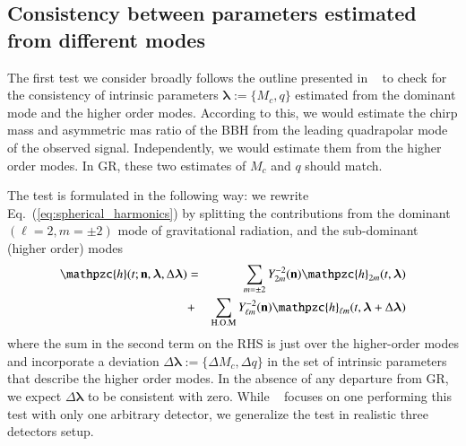 \documentclass[prd,preprintnumbers,twocolumn,eqsecnum,floatfix,a4paper,nofootinbib,superscriptaddress]{revtex4}
\newcommand{\h}{\mathpzc{h}}
\newcommand{\hlm}{\mathpzc{h}_{\ell m}}
\newcommand{\Ylm}{{Y}^{-2}_{\ell m}}
\newcommand{\blambda}{\bm{\lambda}}
\newcommand{\n}{\mathbf{n}}
\begin{document}
\subsection{Consistency between parameters estimated from different modes}
\label{sec3a}
The first test we consider broadly follows the outline presented in ~\cite{dhanpal2018} to check for the consistency of intrinsic parameters $\blambda := \{M_c, q\}$ estimated from the dominant mode and the higher order modes. According to this, we would estimate the chirp mass and asymmetric mas ratio of the BBH from the leading quadrapolar mode of the observed signal. Independently, we would estimate them from the higher order modes. In GR, these two estimates of $M_c$ and $q$ should match. 

The test is formulated in the following way: we rewrite Eq.~(\ref{eq:spherical_harmonics}) by splitting the contributions from the dominant $(\ell = 2, m = \pm 2)$ mode of gravitational radiation, and the sub-dominant (higher order) modes 
\begin{eqnarray}
\h(t; \n, \blambda, \Delta \blambda) & = & \sum_{m = \pm2} Y^{-2}_{2m} (\n) {\h}_{2m}(t, \blambda)  \nonumber \\ 
& + & \sum _{\text{H.O.M}} \Ylm (\n) \hlm(t, \blambda+\Delta \blambda)
\label{eq:test_HM}
\end{eqnarray}
where the sum in the second term on the RHS is just over the higher-order modes and incorporate a deviation $\Delta \blambda := \{\Delta M_c, \Delta q\}$ in the set of intrinsic parameters that describe the higher order modes. In the absence of any departure from GR, we expect $\Delta \blambda $ to be consistent with zero. While ~\cite{dhanpal2018} focuses on one performing this test with only one arbitrary detector, we generalize the test in realistic three detectors setup.
\end{document}
